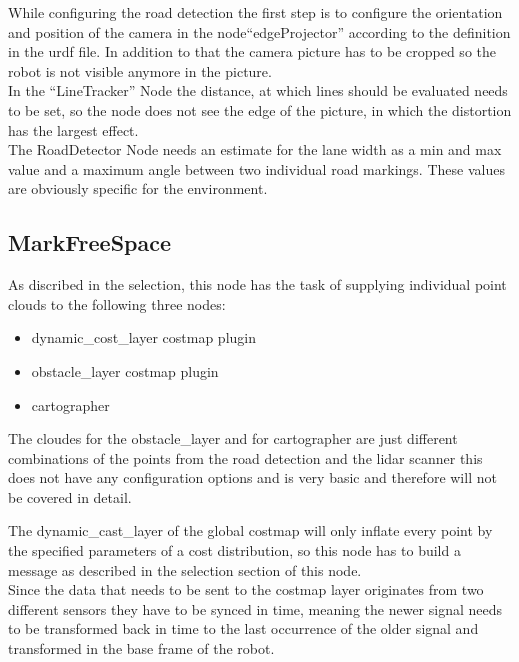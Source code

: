 While configuring the road detection the first step is to configure the orientation and position of the camera in the node``edgeProjector'' according to the definition in the urdf file. In addition to that the camera picture has to be cropped so the robot is not visible anymore in the picture.\\

In the ``LineTracker'' Node the distance, at which lines should be evaluated needs to be set, so the node does not see the edge of the picture, in which the distortion has the largest effect.\\


The RoadDetector Node needs an estimate for the lane width as a min and max value and a maximum angle between two individual road markings. These values are obviously specific for the environment.\\

\subsection{MarkFreeSpace}

As discribed in the selection, this node has the task of supplying individual point clouds to the following three nodes:

\begin{itemize}
	\item dynamic\_cost\_layer costmap plugin
	\item obstacle\_layer costmap plugin
	\item cartographer
\end{itemize}

The cloudes for the obstacle\_layer and for cartographer are just different combinations of the points from the road detection and the lidar scanner this does not have any configuration options and is very basic and therefore will not be covered in detail.

The dynamic\_cast\_layer of the global costmap will only inflate every point by the specified parameters of a cost distribution, so this node has to build a message as described in the selection section of this node.\\

Since the data that needs to be sent to the costmap layer originates from two different sensors they have to be synced in time, meaning the newer signal needs to be transformed back in time to the last occurrence of the older signal and transformed in the base frame of the robot.\\

